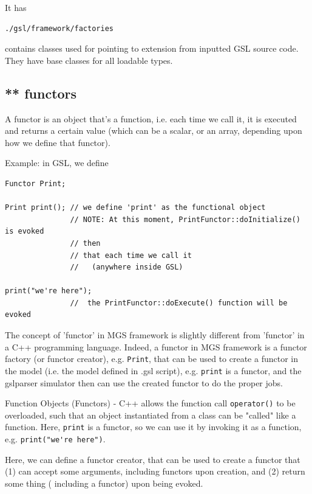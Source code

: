 It has 
\begin{verbatim}
./gsl/framework/factories
\end{verbatim}
contains classes used for pointing to extension from inputted GSL source code.
They have base classes for all loadable types.

\subsection{ ** functors}
\label{sec:functors-in-MGS-framework}
\label{sec:Functor-MGS}

A functor is an object that's a function, i.e. each time we call it, it is
executed and returns a certain value (which can be a scalar, or an array,
depending upon how we define that functor).

Example: in GSL, we define
\begin{verbatim}
Functor Print;

Print print(); // we define 'print' as the functional object
               // NOTE: At this moment, PrintFunctor::doInitialize() is evoked
               // then
               // that each time we call it 
               //   (anywhere inside GSL)

print("we're here");
               //  the PrintFunctor::doExecute() function will be evoked
\end{verbatim}

The concept of 'functor' in MGS framework is slightly different from 'functor'
in a C++ programming language. Indeed, a functor in MGS framework is a functor
factory (or functor creator), e.g. \verb!Print!, that can be used to create a
functor in the model (i.e. the model defined in .gsl script), e.g. \verb!print!
is a functor, and the gslparser simulator then can use the created functor to do
the proper jobs.

\begin{mdframed}

Function Objects (Functors) - C++ allows the function call \verb!operator()! to
be overloaded, such that an object instantiated from a class can be "called"
like a function. Here, \verb!print! is a functor, so we can use it by invoking
it as a function, e.g. \verb!print("we're here")!.

\end{mdframed}

Here, we can define a functor creator, that can be used to create a functor that
(1) can accept some arguments, including functors upon creation, and (2) return
some thing ( including a functor) upon being evoked.

